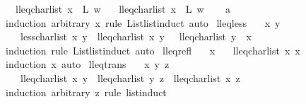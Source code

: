 \begin{isabellebody}
\ \ {\isachardoublequoteopen}lleq{\isacharunderscore}charlist\ {\isacharparenleft}x\ {\isacharhash}\ L{}{\isacharparenright}\ w{\isachardoublequoteclose}\isanewline
\ \ \ {\isachardoublequoteopen}lleq{\isacharunderscore}charlist\ {\isacharparenleft}x\ {\isacharhash}\ L{}{\isacharparenright}\ w{\isachardoublequoteclose}\isanewline
%
\isadelimproof
\ \ %
\endisadelimproof
%
\isatagproof
{}\isamarkupfalse%
\ a\ \isamarkupfalse%
{\isacharparenleft}induction\ arbitrary{\isacharcolon}\ x\ rule{\isacharcolon}\ List{\isachardot}list{\isacharunderscore}induct{}{\isacharprime}{\isacharcomma}\ auto{\isacharparenright}%
\endisatagproof
{\isafoldproof}%
%
\isadelimproof
\isanewline
%
\endisadelimproof
\isanewline
{}\isamarkupfalse%
\ lleq{\isacharunderscore}less{\isacharcolon}\isanewline
\ \ \ x\ y\isanewline
\ \ \ {\isachardoublequoteopen}{\isacharparenleft}less{\isacharunderscore}charlist\ x\ y{\isacharparenright}\ {\isacharequal}\ {\isacharparenleft}lleq{\isacharunderscore}charlist\ x\ y\ {\isasymand}\ {\isasymnot}\ lleq{\isacharunderscore}charlist\ y\ \ x{\isacharparenright}{\isachardoublequoteclose}\isanewline
%
\isadelimproof
\ \ %
\endisadelimproof
%
\isatagproof
{}\isamarkupfalse%
{\isacharparenleft}induction\ rule{\isacharcolon}\ List{\isachardot}list{\isacharunderscore}induct{}{\isacharprime}{\isacharcomma}\ auto{\isacharparenright}%
\endisatagproof
{\isafoldproof}%
%
\isadelimproof
\isanewline
%
\endisadelimproof
\isanewline
{}\isamarkupfalse%
\ lleq{\isacharunderscore}refl{\isacharcolon}\isanewline
\ \ \ x\isanewline
\ \ \ {\isachardoublequoteopen}lleq{\isacharunderscore}charlist\ x\ x{\isachardoublequoteclose}\isanewline
%
\isadelimproof
\ \ %
\endisadelimproof
%
\isatagproof
{}\isamarkupfalse%
{\isacharparenleft}induction\ x{\isacharcomma}\ auto{\isacharparenright}%
\endisatagproof
{\isafoldproof}%
%
\isadelimproof
\isanewline
%
\endisadelimproof
\isanewline
{}\isamarkupfalse%
\ lleq{\isacharunderscore}trans{\isacharcolon}\isanewline
\ \ \ x\ y\ z\isanewline
\ \ \ {\isachardoublequoteopen}lleq{\isacharunderscore}charlist\ x\ y\ {\isasymLongrightarrow}\ lleq{\isacharunderscore}charlist\ y\ z\ {\isasymLongrightarrow}\ lleq{\isacharunderscore}charlist\ x\ z{\isachardoublequoteclose}\isanewline
%
\isadelimproof
%
\endisadelimproof
%
\isatagproof
{}\isamarkupfalse%
{\isacharparenleft}induction\ arbitrary{\isacharcolon}\ z\ rule{\isacharcolon}\ list{\isacharunderscore}induct{}{\isacharprime}{\isacharparenright}\ \isanewline

\end{isabellebody}
